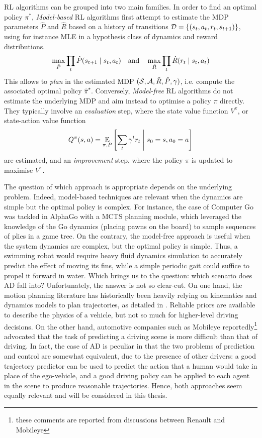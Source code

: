 \ac*{RL} algorithms can be grouped into two main families. 
In order to find an optimal policy $\pi^*$, \emph{Model-based} \ac*{RL} algorithms first attempt to estimate the \ac*{MDP} parameters $\hat{P}$ and $\hat{R}$ based on a history of transitions $\mathcal{D} = \{(s_{t},a_t, r_t, s_{t+1})\}$, using for instance \ac{MLE} in a hypothesis class of dynamics and reward distributions.
\begin{equation*}
\max_{\hat{P}} \prod_{t}\hat{P}\lparen s_{t+1} \mid s_t,a_t\rparen \quad \text{and} \quad \max_{\hat{R}} \prod_{t}\hat{R}\lparen r_{t} \mid s_t,a_t\rparen
\end{equation*}
This allows to \emph{plan} in the estimated \ac*{MDP} $(\mathcal{S},\mathcal{A},\hat{R}, \hat{P}, \gamma)$, i.e. compute the associated optimal policy $\hat{\pi}^\star$. Conversely, \emph{Model-free} \ac*{RL} algorithms do not estimate the underlying \ac*{MDP} and aim instead to optimise a policy $\pi$ directly. They typically involve an \emph{evaluation} step, where the state value function $V^\pi$, or state-action value function
\begin{equation*}
Q^\pi(s,a) = \operatorname*{\mathbb{E}}_{\pi, P} \left[\sum_t \gamma^t r_t\;\middle|\; s_0 = s, a_0 = a\right]
\end{equation*}
are estimated, and an \emph{improvement} step, where the policy $\pi$ is updated to maximise $V^\pi$.

The question of which approach is appropriate depends on the underlying problem. Indeed, model-based techniques are relevant when the dynamics are simple but the optimal policy is complex. For instance, the case of Computer Go was tackled in AlphaGo \citep{Silver2016,Silver2017,Silver2018} with a \ac{MCTS} planning module, which leveraged the knowledge of the Go dynamics (placing pawns on the board) to sample sequences of plies in a game tree. On the contrary, the model-free approach is useful when the system dynamics are complex, but the optimal policy is simple. Thus, a swimming robot would require heavy fluid dynamics simulation to accurately predict the effect of moving its fins, while a simple periodic gait could suffice to propel it forward in water. Which brings us to the question: which scenario does \ac*{AD} fall into? Unfortunately, the answer is not so clear-cut. On one hand, the motion planning literature has historically been heavily relying on kinematics and dynamics models to plan trajectories, as detailed in . Reliable priors are available to describe the physics of a vehicle, but not so much for higher-level driving decisions. On the other hand, automotive companies such as Mobileye reportedly\footnote{these comments are reported from discussions between Renault and Mobileye} advocated that the task of predicting a driving scene is more difficult than that of driving. In fact, the case of \acl*{AD} is peculiar in that the two problems of prediction and control are somewhat equivalent, due to the presence of other drivers: a good trajectory predictor can be used to predict the action that a human would take in place of the ego-vehicle, and a good driving policy can be applied to each agent in the scene to produce reasonable trajectories. Hence, both approaches seem equally relevant and will be considered in this thesis.

